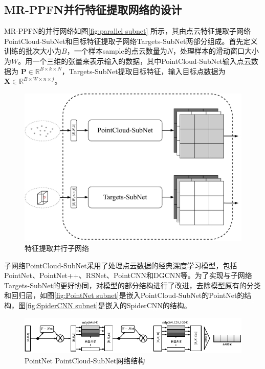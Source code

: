 \subsection{MR-PPFN并行特征提取网络的设计}
\label{subsec:MR-PPFN Network Design}
MR-PPFN的并行网络如图\eqref{fig:parallel subnet}
所示，其由点云特征提取子网络PointCloud-SubNet和目标特征提取子网络Targets-SubNet两部分组成。首先定义训练的批次大小为$B$，一个样本sample的点云数量为$N$，处理样本的滑动窗口大小为$W$。用一个三维的张量来表示输入的数据，其中PointCloud-SubNet输入点云数据为  \( \mathbf{P} \in \mathbb{R}^{B \times k \times N} \)，Targets-SubNet提取目标特征，输入目标点数据为\( \mathbf{X} \in \mathbb{R}^{B \times W \times n \times j} \)。
\begin{figure}[htbp]
    \centering
    \includegraphics[width=0.8\linewidth]{imgs/parallel subnet.pdf}
    \caption{特征提取并行子网络}
    \label{fig:parallel subnet}
\end{figure}

子网络PointCloud-SubNet采用了处理点云数据的经典深度学习模型，包括PointNet、PointNet++、RSNet、PointCNN和DGCNN等。为了实现与子网络Targets-SubNet的更好协同，对模型的部分结构进行了改进，去除模型原有的分类和回归层，如图\eqref{fig:PointNet subnet}是嵌入PointCloud-SubNet的PointNet的结构，图\eqref{fig:SpiderCNN subnet}是嵌入的SpiderCNN的结构。
\begin{figure}[htbp]
    \centering
    \includegraphics[width=1\linewidth]{imgs/pointnet.pdf}
    \caption{PointNet PointCloud-SubNet网络结构}
    \label{fig:PointNet subnet}
\end{figure}

